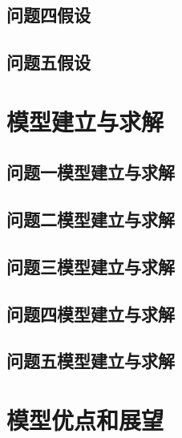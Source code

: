 \documentclass{article}
\begin{document}
\subsection{问题四假设}

\subsection{问题五假设}

\section{模型建立与求解}

\subsection{问题一模型建立与求解}

\subsection{问题二模型建立与求解}

\subsection{问题三模型建立与求解}

\subsection{问题四模型建立与求解}

\subsection{问题五模型建立与求解}

\section{模型优点和展望}
\end{document}
